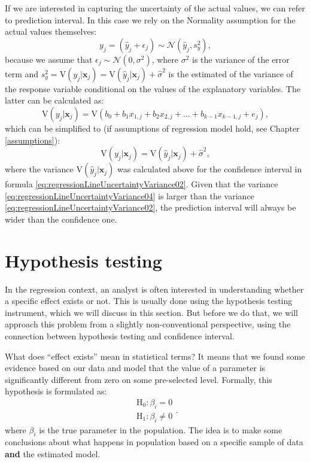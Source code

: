 \documentclass[
]{book}
\theoremstyle{definition}
\theoremstyle{definition}
\theoremstyle{definition}
\theoremstyle{definition}
\theoremstyle{remark}
\begin{document}
If we are interested in capturing the uncertainty of the actual values, we can refer to prediction interval. In this case we rely on the Normality assumption for the actual values themselves:
\begin{equation*}
y_j = (\hat{y}_j + \epsilon_j) \sim \mathcal{N}(\hat{y}_j, s_y^2) ,
\end{equation*}
because we assume that \(\epsilon_j \sim \mathcal{N}(0, {\sigma}^2)\), where \({\sigma}^2\) is the variance of the error term and \(s_y^2 = \mathrm{V}(y_j| \mathbf{x}_j) = \mathrm{V}(\hat{y}_j| \mathbf{x}_j) + \hat{\sigma}^2\) is the estimated of the variance of the response variable conditional on the values of the explanatory variables. The latter can be calculated as:
\begin{equation}
\mathrm{V}(y_j| \mathbf{x}_j) = \mathrm{V}(b_0 + b_1 x_{1,j} + b_2 x_{2,j} + \dots + b_{k-1} x_{k-1,j} + e_j) ,
\label{eq:regressionLineUncertaintyVariance03}
\end{equation}
which can be simplified to (if assumptions of regression model hold, see Chapter \ref{assumptions}):
\begin{equation}
\mathrm{V}(y_j| \mathbf{x}_j) = \mathrm{V}(\hat{y}_j | \mathbf{x}_j) + \hat{\sigma}^2,
\label{eq:regressionLineUncertaintyVariance04}
\end{equation}
where the variance \(\mathrm{V}(\hat{y}_j | \mathbf{x}_j)\) was calculated above for the confidence interval in formula \eqref{eq:regressionLineUncertaintyVariance02}. Given that the variance \eqref{eq:regressionLineUncertaintyVariance04} is larger than the variance \eqref{eq:regressionLineUncertaintyVariance02}, the prediction interval will always be wider than the confidence one.

\section{Hypothesis testing}\label{uncertaintyRegressionHypothesis}

In the regression context, an analyst is often interested in understanding whether a specific effect exists or not. This is usually done using the hypothesis testing instrument, which we will discuss in this section. But before we do that, we will approach this problem from a slightly non-conventional perspective, using the connection between hypothesis testing and confidence interval.

What does ``effect exists'' mean in statistical terms? It means that we found some evidence based on our data and model that the value of a parameter is significantly different from zero on some pre-selected level. Formally, this hypothesis is formulated as:
\begin{equation}
\begin{aligned}
\mathrm{H}_0: \beta_i = 0 \\
\mathrm{H}_1: \beta_i \neq 0
\end{aligned} .
\label{eq:regressionHypothesis01}
\end{equation}
where \(\beta_i\) is the true parameter in the population. The idea is to make some conclusions about what happens in population based on a specific sample of data \textbf{and} the estimated model.
\end{document}
